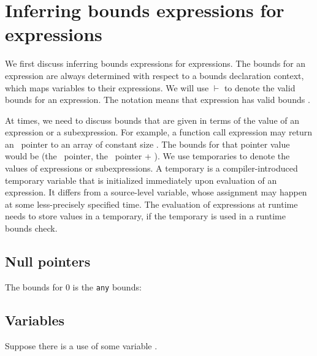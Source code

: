 \section{Inferring bounds expressions for expressions}
\label{section:inferring-expression-bounds}

We first discuss inferring bounds expressions for expressions. The bounds for an
expression are always determined with respect to a bounds
declaration context, which maps variables to their
expressions.  We will use $\vdash$ to denote the
valid bounds for an expression. The notation 
means that expression  has valid bounds .

At times, we need to discuss bounds that are given in terms of the value
of an expression or a subexpression.   For example, a function call expression may
return an \arrayptr\ pointer to an array of constant size
. The bounds for that pointer value would be (the
\arrayptr\ pointer, the \arrayptr\ pointer +
). We use temporaries to denote the values
of expressions or subexpressions.   A temporary is a compiler-introduced
temporary variable that is initialized immediately upon evaluation of an
expression.   It differs from a source-level variable, whose assignment
may happen at some less-precisely specified time.   The evaluation of
expressions at runtime needs to store values in a temporary, 
if the temporary is used in a runtime
bounds check.

\subsection{Null pointers}

The bounds for 0 is the \lstinline|any| bounds:


\subsection{Variables}
\label{section:checking-variables}

Suppose there is a use of some variable .

